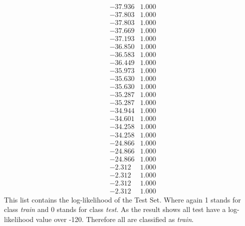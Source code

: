 \documentclass[conference]{IEEEtran}
\begin{document}
$$\begin{smallmatrix}
 &-37.936 &1.000\\
 &-37.803 &1.000\\
 &-37.803 &1.000\\
 &-37.669 &1.000\\
 &-37.193 &1.000\\
 &-36.850 &1.000\\
 &-36.583 &1.000\\
 &-36.449 &1.000\\
 &-35.973 &1.000\\
 &-35.630 &1.000\\
 &-35.630 &1.000\\
 &-35.287 &1.000\\
 &-35.287 &1.000\\
 &-34.944 &1.000\\
 &-34.601 &1.000\\
 &-34.258 &1.000\\
 &-34.258 &1.000\\
 &-24.866 &1.000\\
 &-24.866 &1.000\\
 &-24.866 &1.000\\
 &-2.312 &1.000\\
 &-2.312 &1.000\\
 &-2.312 &1.000\\
 &-2.312 &1.000
 \end{smallmatrix}
$$
\newpage
This list contains the log-likelihood of the Test Set. Where again 1 stands for class \textit{train} and 0 stands for class \textit{test}. As the result shows all test have a log-likelihood value over -120. Therefore all are classified as \textit{train}.
\end{document}
